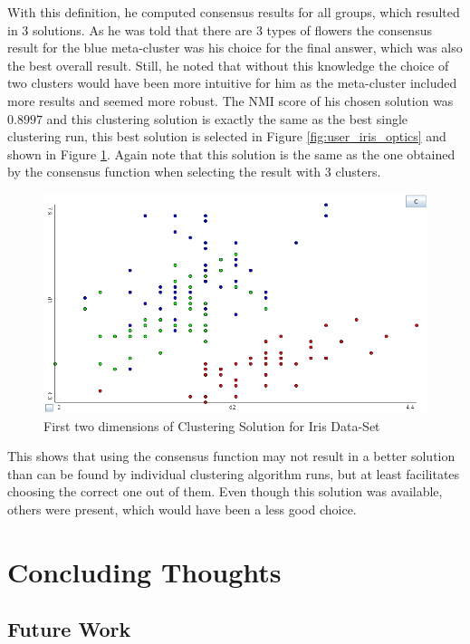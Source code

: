 \documentclass[
	a4paper,
	english,
	twoside,
	openright,               
	11pt                            
	]{report}
\begin{document}
With this definition, he computed consensus results for all groups, which resulted in 3 solutions. As he was told that there are 3 types of flowers the consensus result for the blue meta-cluster was his choice for the final answer, which was also the best overall result. Still, he noted that without this knowledge the choice of two clusters would have been more intuitive for him as the meta-cluster included more results and seemed more robust. The NMI score of his chosen solution was $0.8997$ and this clustering solution is exactly the same as the best single clustering run, this best solution is selected in Figure \ref{fig:user_iris_optics} and shown in Figure \ref{fig:user_iris_best}. Again note that this solution is the same as the one obtained by the consensus function when selecting the result with $3$ clusters.

\begin{figure}[h]
	\centering
	\includegraphics[scale=.5]{user_iris_best}
	\caption{First two dimensions of Clustering Solution for Iris Data-Set}
	\label{fig:user_iris_best}
\end{figure}

This shows that using the consensus function may not result in a better solution than can be found by individual clustering algorithm runs, but at least facilitates choosing the correct one out of them. Even though this solution was available, others were present, which would have been a less good choice.

\part{Concluding Thoughts}

\chapter{Future Work}\label{cha:futurework}
\end{document}
